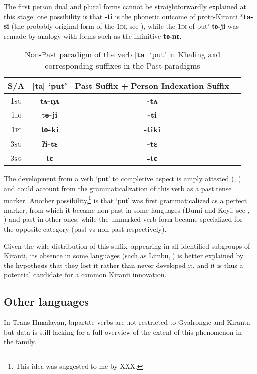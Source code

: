 \documentclass[11pt]{article}
\newcommand{\ipa}[1]{{\phon\textbf{#1}}}
\newcommand{\dhatu}[2]{|\ipa{#1}| `#2'}
\begin{document}
 The first person dual and plural forms cannot be straightforwardly explained at this stage; one possibility is that \ipa{-ti} is the phonetic outcome of proto-Kiranti *\ipa{ta-si} (the probably original form of the \textsc{1di}, see \citealt[58]{jacques16tonogenesis}), while the \textsc{1di} of  put' \ipa{tɵ-ji} was remade by analogy with forms such as the infinitive \ipa{tɵ-nɛ}.

\begin{table}[H]
\caption{Non-Past paradigm of the verb \dhatu{ta}{put} in Khaling and corresponding suffixes in the Past paradigms} \centering \label{tab:tANA}
\begin{tabular}{cccc}
\toprule
S/A & \dhatu{ta}{put} & Past Suffix + Person Indexation Suffix \\
\midrule
\textsc{1sg} & \ipa{tʌ-ŋʌ} &  \ipa{-tʌ}  \\
\textsc{1di} & \ipa{tɵ-ji} &  \ipa{-ti}  \\
\textsc{1pi} & \ipa{tɵ-ki} & \ipa{-tiki}  \\
\textsc{3sg} & \ipa{ʔi-tɛ} & \ipa{-tɛ}  \\
\textsc{3sg} & \ipa{tɛ} & \ipa{-tɛ}  \\
\bottomrule
\end{tabular}
\end{table}


The development from a verb `put' to completive aspect is amply attested (\citealt[58]{bybee94TAM}, \citealt[248]{heine-kuteva02}) and could account from the grammaticalization of this verb as a past tense marker. Another possibility,\footnote{This idea was suggested to me by XXX. %
} is that `put' was first grammaticalized as a perfect marker, from which it became non-past in some languages (Dumi and Koyi, see \citealt{driem93dumi}, \citealt{lahaussois09}) and past in other ones, while the unmarked verb form became specialized for the opposite category (past vs non-past respectively).

Given the wide distribution of this suffix, appearing in all identified subgroups of Kiranti, its absence in some languages (such as Limbu, \citealt{driem87}) is better explained by the hypothesis that they lost it rather than never developed it, and it is thus a potential candidate for a common Kiranti innovation.

\subsection{Other languages} \label{sec:rawang.bipart}
In Trans-Himalayan, bipartite verbs are not restricted to Gyalrongic and Kiranti, but data is still lacking for a full overview of the extent of this phenomenon in the family.
\end{document}
